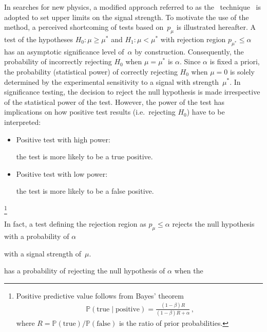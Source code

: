 In searches for new physics, a modified approach referred to as the
\CLs~technique~\cite{Junk:1999kv,Read:2000ru,Read:2002hq} is adopted to set
upper limits on the signal strength. To motivate the use of the \CLs method, a
perceived shortcoming of tests based on~$p_\mu$ is illustrated hereafter. A test
of the hypotheses $H_0: \mu \geq \mu^*$ and $H_1: \mu < \mu^*$ with rejection
region $p_{\mu^*} \leq \alpha$ has an asymptotic significance level of~$\alpha$
by construction. Consequently, the probability of incorrectly rejecting $H_0$
when $\mu = \mu^*$ is $\alpha$. Since $\alpha$ is fixed a priori, the
probability (statistical power) of correctly rejecting $H_0$ when $\mu = 0$
is solely determined by the experimental sensitivity to a signal with
strength~$\mu^{*}$. In significance testing, the decision to reject the null
hypothesis is made irrespective of the statistical power of the test. However,
the power of the test has implications on how positive test results (i.e.\
rejecting $H_0$) have to be interpreted:
\begin{itemize}

\item Positive test with high power:

  the test is more likely to be a true positive.

\item Positive test with low power:

  the test is more likely to be a false positive.

\end{itemize}


\footnote{Positive predictive value follows from Bayes' theorem
  \begin{align*}
    \mathbb{P}(\text{true} \mid \text{positive}) = \frac{(1 - \beta) R}{(1 - \beta) R + \alpha} \,\text{,}
  \end{align*}
  where $R = \mathbb{P}(\text{true}) / \mathbb{P}(\text{false})$ is the ratio of
  prior probabilities.}










In fact, a test defining the rejection region as $p_\mu \leq \alpha$ rejects the
null hypothesis with a probability of $\alpha$


with a signal strength
of~$\mu$.


has a
probability of rejecting the null hypothesis of $\alpha$ when the

